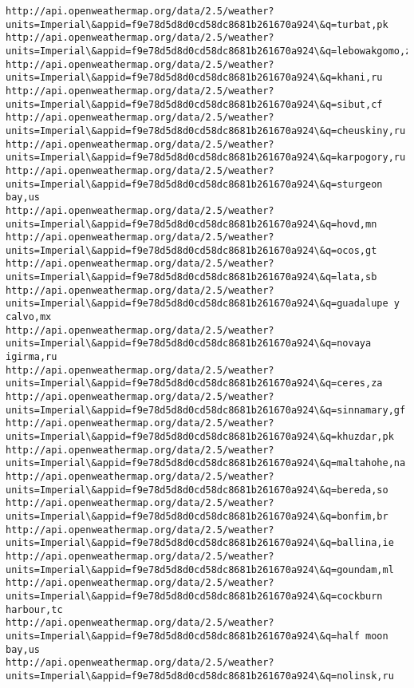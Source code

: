 \documentclass[11pt]{article}
\begin{document}
\begin{Verbatim}[commandchars=\\\{\}]
http://api.openweathermap.org/data/2.5/weather?units=Imperial\&appid=f9e78d5d8d0cd58dc8681b261670a924\&q=turbat,pk
http://api.openweathermap.org/data/2.5/weather?units=Imperial\&appid=f9e78d5d8d0cd58dc8681b261670a924\&q=lebowakgomo,za
http://api.openweathermap.org/data/2.5/weather?units=Imperial\&appid=f9e78d5d8d0cd58dc8681b261670a924\&q=khani,ru
http://api.openweathermap.org/data/2.5/weather?units=Imperial\&appid=f9e78d5d8d0cd58dc8681b261670a924\&q=sibut,cf
http://api.openweathermap.org/data/2.5/weather?units=Imperial\&appid=f9e78d5d8d0cd58dc8681b261670a924\&q=cheuskiny,ru
http://api.openweathermap.org/data/2.5/weather?units=Imperial\&appid=f9e78d5d8d0cd58dc8681b261670a924\&q=karpogory,ru
http://api.openweathermap.org/data/2.5/weather?units=Imperial\&appid=f9e78d5d8d0cd58dc8681b261670a924\&q=sturgeon bay,us
http://api.openweathermap.org/data/2.5/weather?units=Imperial\&appid=f9e78d5d8d0cd58dc8681b261670a924\&q=hovd,mn
http://api.openweathermap.org/data/2.5/weather?units=Imperial\&appid=f9e78d5d8d0cd58dc8681b261670a924\&q=ocos,gt
http://api.openweathermap.org/data/2.5/weather?units=Imperial\&appid=f9e78d5d8d0cd58dc8681b261670a924\&q=lata,sb
http://api.openweathermap.org/data/2.5/weather?units=Imperial\&appid=f9e78d5d8d0cd58dc8681b261670a924\&q=guadalupe y calvo,mx
http://api.openweathermap.org/data/2.5/weather?units=Imperial\&appid=f9e78d5d8d0cd58dc8681b261670a924\&q=novaya igirma,ru
http://api.openweathermap.org/data/2.5/weather?units=Imperial\&appid=f9e78d5d8d0cd58dc8681b261670a924\&q=ceres,za
http://api.openweathermap.org/data/2.5/weather?units=Imperial\&appid=f9e78d5d8d0cd58dc8681b261670a924\&q=sinnamary,gf
http://api.openweathermap.org/data/2.5/weather?units=Imperial\&appid=f9e78d5d8d0cd58dc8681b261670a924\&q=khuzdar,pk
http://api.openweathermap.org/data/2.5/weather?units=Imperial\&appid=f9e78d5d8d0cd58dc8681b261670a924\&q=maltahohe,na
http://api.openweathermap.org/data/2.5/weather?units=Imperial\&appid=f9e78d5d8d0cd58dc8681b261670a924\&q=bereda,so
http://api.openweathermap.org/data/2.5/weather?units=Imperial\&appid=f9e78d5d8d0cd58dc8681b261670a924\&q=bonfim,br
http://api.openweathermap.org/data/2.5/weather?units=Imperial\&appid=f9e78d5d8d0cd58dc8681b261670a924\&q=ballina,ie
http://api.openweathermap.org/data/2.5/weather?units=Imperial\&appid=f9e78d5d8d0cd58dc8681b261670a924\&q=goundam,ml
http://api.openweathermap.org/data/2.5/weather?units=Imperial\&appid=f9e78d5d8d0cd58dc8681b261670a924\&q=cockburn harbour,tc
http://api.openweathermap.org/data/2.5/weather?units=Imperial\&appid=f9e78d5d8d0cd58dc8681b261670a924\&q=half moon bay,us
http://api.openweathermap.org/data/2.5/weather?units=Imperial\&appid=f9e78d5d8d0cd58dc8681b261670a924\&q=nolinsk,ru

\end{Verbatim}
\end{document}
